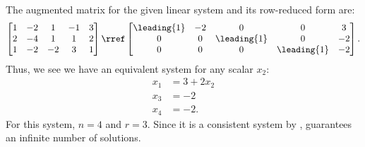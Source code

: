 The augmented matrix for the given linear system and its row-reduced form are:
\begin{align*}
\begin{bmatrix}
1 & -2 & 1 & -1 & 3\\
2 & -4 & 1 & 1 & 2\\
1 & -2 & -2 & 3 & 1
\end{bmatrix}
\rref
\begin{bmatrix}
\leading{1}  & -2 & 0 & 0 & 3\\
0 & 0 & \leading{1}  & 0 & -2\\
0 & 0 & 0 & \leading{1}  & -2
\end{bmatrix}.
\end{align*}
Thus, we see we have an equivalent system for any scalar $x_2$:
\begin{align*}
x_1 &= 3 + 2x_2\\
x_3 &= -2\\
x_4 &= -2.
\end{align*}
For this system, $n = 4$ and $r = 3$.  Since it is a consistent system by ,   guarantees an infinite number of solutions.